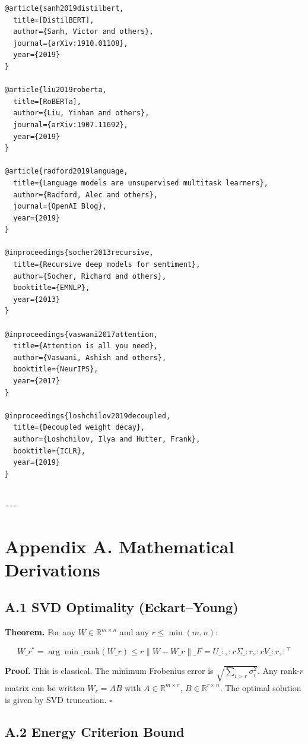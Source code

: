 \begin{lstlisting}
@article{sanh2019distilbert,
  title=[DistilBERT],
  author={Sanh, Victor and others},
  journal={arXiv:1910.01108},
  year={2019}
}

@article{liu2019roberta,
  title=[RoBERTa],
  author={Liu, Yinhan and others},
  journal={arXiv:1907.11692},
  year={2019}
}

@article{radford2019language,
  title={Language models are unsupervised multitask learners},
  author={Radford, Alec and others},
  journal={OpenAI Blog},
  year={2019}
}

@inproceedings{socher2013recursive,
  title={Recursive deep models for sentiment},
  author={Socher, Richard and others},
  booktitle={EMNLP},
  year={2013}
}

@inproceedings{vaswani2017attention,
  title={Attention is all you need},
  author={Vaswani, Ashish and others},
  booktitle={NeurIPS},
  year={2017}
}

@inproceedings{loshchilov2019decoupled,
  title={Decoupled weight decay},
  author={Loshchilov, Ilya and Hutter, Frank},
  booktitle={ICLR},
  year={2019}
}
\end{lstlisting}
\begin{lstlisting}

---
\end{lstlisting}


\section{Appendix A. Mathematical Derivations}

\subsection{A.1 SVD Optimality (Eckart--Young)}

\textbf{Theorem.} For any $W \in \mathbb{R}^{m \times n}$ and any $r \leq \min(m, n)$:

\[
W\_r^* = \arg\min\_{\text{rank}(W\_r) \leq r} \|W - W\_r\|\_F = U\_{:, :r} \Sigma\_{:r, :r} V\_{:r, :}^\top
\tag{A.1}
\]

\textbf{Proof.} This is classical. The minimum Frobenius error is 
$\sqrt{\sum_{i > r} \sigma_i^2}$. Any rank-$r$ matrix can be written 
$W_r = A B$ with $A \in \mathbb{R}^{m \times r}$, $B \in \mathbb{R}^{r \times n}$. 
The optimal solution is given by SVD truncation. $\square$

\subsection{A.2 Energy Criterion Bound}

